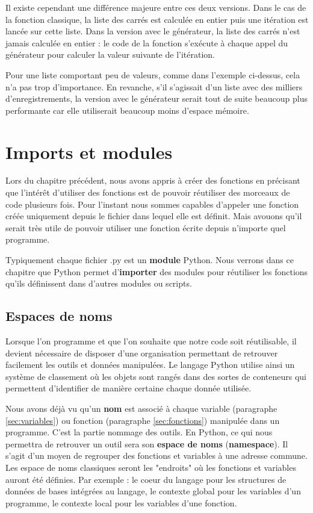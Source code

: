 \documentclass[12pt, a4paper]{article}
\begin{document}
Il existe cependant une différence majeure entre ces deux versions. Dans le cas de la fonction classique, la liste des carrés est calculée en entier puis une itération est lancée sur cette liste. Dans la version avec le générateur, la liste des carrés n'est jamais calculée en entier : le code de la fonction s'exécute à chaque appel du générateur pour calculer la valeur suivante de l'itération.

Pour une liste comportant peu de valeurs, comme dans l'exemple ci-dessus, cela n'a pas trop d'importance. En revanche, s'il s'agissait d'un liste avec des milliers d'enregistrements, la version avec le générateur serait tout de suite beaucoup plus performante car elle utiliserait beaucoup moins d'espace mémoire.



\section{Imports et modules}
\label{sec:modules}
Lors du chapitre précédent, nous avons appris à créer des fonctions en précisant que l'intérêt d'utiliser des fonctions est de pouvoir réutiliser des morceaux de code plusieurs fois. Pour l'instant nous sommes capables d'appeler une fonction créée uniquement depuis le fichier dans lequel elle est définit. Mais avouons qu'il serait très utile de pouvoir utiliser une fonction écrite depuis n'importe quel programme. 

Typiquement chaque fichier .py est un \textbf{module} Python. Nous verrons dans ce chapitre que Python permet d'\textbf{importer} des modules pour réutiliser les fonctions qu'ils définissent dans d'autres modules ou scripts.

\subsection{Espaces de noms}
Lorsque l'on programme et que l'on souhaite que notre code soit réutilisable, il devient nécessaire de disposer d'une organisation permettant de retrouver facilement les outils et données manipulées. Le langage Python utilise ainsi un système de classement où les objets sont rangés dans des sortes de conteneurs qui permettent d'identifier de manière certaine chaque donnée utilisée.

Nous avons déjà vu qu'un \textbf{nom} est associé à chaque variable (paragraphe \ref{sec:variables}) ou fonction (paragraphe \ref{sec:fonctions}) manipulée dans un programme. C'est la partie nommage des outils. En Python, ce qui nous permettra de retrouver un outil sera son \textbf{espace de noms} (\textbf{namespace}). Il s'agit d'un moyen de regrouper des fonctions et variables à une adresse commune. Les espace de noms classiques seront les "endroits" où les fonctions et variables auront été définies. Par exemple : le coeur du langage pour les structures de données de bases intégrées au langage, le contexte global pour les variables d'un programme, le contexte local pour les variables d'une fonction.
\end{document}
